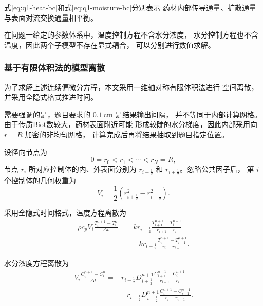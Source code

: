 \documentclass[12pt,a4paper]{article}
\begin{document}
式\eqref{eq:q1-heat-bc}和式\eqref{eq:q1-moisture-bc}分别表示
药材内部传导通量、扩散通量与表面对流交换通量相平衡。

在问题一给定的参数体系中，温度控制方程不含水分浓度，
水分控制方程也不含温度，因此两个子模型不存在显式耦合，
可以分别进行数值求解。

\subsubsection{基于有限体积法的模型离散}

为了求解上述连续偏微分方程，本文采用一维轴对称有限体积法进行
空间离散，并采用全隐式格式推进时间。

需要强调的是，题目要求的 $0.1\ \mathrm{cm}$ 是结果输出间隔，
并不等同于内部计算网格。由于传质Biot数较大，药材表面附近可能
形成较陡的水分梯度，因此内部采用向 $r=R$ 加密的非均匀网格，
计算完成后再将结果抽取到题目指定位置。

设径向节点为
\begin{equation}
0=r_0<r_1<\cdots<r_N=R,
\end{equation}
节点 $r_i$ 所对应控制体的内、外表面分别为
$r_{i-\frac12}$ 和 $r_{i+\frac12}$。忽略公共因子后，
第 $i$ 个控制体的几何权重为
\begin{equation}
V_i=
\frac{1}{2}
\left(
r_{i+\frac12}^{2}-r_{i-\frac12}^{2}
\right).
\label{eq:q1-volume}
\end{equation}

采用全隐式时间格式，温度方程离散为
\begin{equation}
\begin{aligned}
\rho c_pV_i
\frac{T_i^{n+1}-T_i^n}{\Delta t}
={}&
kr_{i+\frac12}
\frac{T_{i+1}^{n+1}-T_i^{n+1}}
{r_{i+1}-r_i}\\
&-
kr_{i-\frac12}
\frac{T_i^{n+1}-T_{i-1}^{n+1}}
{r_i-r_{i-1}}.
\end{aligned}
\label{eq:q1-heat-fvm}
\end{equation}

水分浓度方程离散为
\begin{equation}
\begin{aligned}
V_i
\frac{C_i^{n+1}-C_i^n}{\Delta t}
={}&
r_{i+\frac12}D_{i+\frac12}^{n+1}
\frac{C_{i+1}^{n+1}-C_i^{n+1}}
{r_{i+1}-r_i}\\
&-
r_{i-\frac12}D_{i-\frac12}^{n+1}
\frac{C_i^{n+1}-C_{i-1}^{n+1}}
{r_i-r_{i-1}}.
\end{aligned}
\label{eq:q1-moisture-fvm}
\end{equation}
\end{document}
